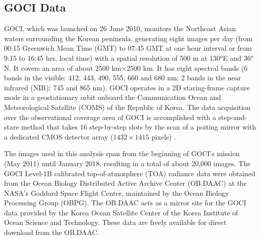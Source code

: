 \documentclass[remotesensing,article,submit,moreauthors,pdftex,10pt,a4paper]{Definitions/mdpi}
\begin{document}
\subsection{GOCI Data}
GOCI, which was launched on 26 June 2010, monitors the Northeast Asian waters surrounding the Korean peninsula, generating eight images per day (from 00:15 Greenwich Mean Time (GMT) to 07:45 GMT at one hour interval or from 9:15 to 16:45 hrs. local time) with a spatial resolution of 500 m at 130$^o$E and 36$^o$N. It covers an area of about 2500 km$\times$2500 km. It has eight spectral bands (6 bands in the visible: 412, 443, 490, 555, 660 and 680 nm; 2 bands in the near infrared (NIR): 745 and 865 nm). GOCI operates in a 2D staring-frame capture mode in a geostationary orbit onboard the Communication Ocean and Meteorological Satellite (COMS) of the Republic of Korea. The data acquisition over the observational coverage area of GOCI is accomplished with a step-and-stare method that takes 16 step-by-step slots by the scan of a poiting mirror with a dedicated CMOS detector array ($1432\times1415$ pixels) \cite{Kang2010}. 

The images used in this analysis span from the beginning of GOCI's mission (May 2011) until January 2018, resulting in a total of about 20,000 images. The GOCI Level-1B calibrated top-of-atmosphere (TOA) radiance data were obtained from the Ocean Biology Distributed Active Archive Center (OB.DAAC) at the NASA's Goddard Space Flight Center, maintained by the Ocean Biology Processing Group (OBPG). The OB.DAAC acts as a mirror site for the GOCI data provided by the Korea Ocean Satellite Center of the Korea Institute of Ocean Science and Technology. These data are freely available for direct download from the OB.DAAC. 
\end{document}
